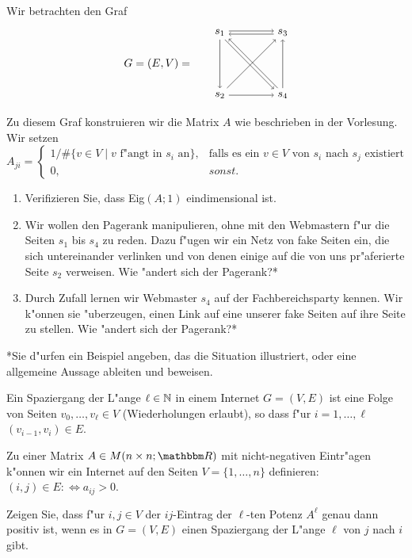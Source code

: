 \documentclass[a4,11pt]{article}
\begin{document}
\begin{aufgabe}[4 Punkte]
Wir betrachten den Graf %
\[
\begin{tikzpicture}
\node at (-2, 1) {$G = (E, V) = $};

\node (s3) at (2,2) {$s_3$};
\node (s4) at (2,0) {$s_4$};
\node (s2) at (0,0) {$s_2$};
\node (s1) at (0,2) {$s_1$};

\draw[->] (s1) -- (s2);
\draw[->] (s1.10) -- (s3.170);
\draw[->] (s1.305) -- (s4.145);

\draw[->] (s2) -- (s3);
\draw[->] (s2) -- (s4);

\draw[->] (s3.190) -- (s1.350);

\draw[->] (s4.125) -- (s1.325);
\draw[->] (s4) -- (s3);
\end{tikzpicture}
\]

Zu diesem Graf konstruieren wir die Matrix $A$ wie beschrieben in der Vorlesung. Wir setzen
\[
A_{ji} = \begin{cases}
1 / \# \{ v \in V \mid v \text{ f"angt in } s_i \text{ an}\}, & \text{falls es ein } v \in V \text{  von } s_i \text{ nach } s_j \text{ existiert}\\
0, & sonst.
\end{cases}
\]

\begin{enumerate}
\item
Verifizieren Sie, dass Eig$(A;1)$ eindimensional ist.
\item
Wir wollen den Pagerank manipulieren, ohne mit den Webmastern f"ur
  die Seiten $s_1$ bis $s_4$ zu reden. Dazu f"ugen wir ein Netz von fake
  Seiten ein, die sich untereinander verlinken und von denen einige
  auf die von uns pr"aferierte Seite $s_2$ verweisen.
  Wie "andert sich der Pagerank?*
 \item
  Durch Zufall lernen wir Webmaster $s_4$ auf der Fachbereichsparty
  kennen. Wir k"onnen sie "uberzeugen, einen Link auf eine unserer
  fake Seiten auf ihre Seite zu stellen. Wie "andert sich der Pagerank?*
\end{enumerate}
 *Sie d"urfen ein Beispiel angeben, das die Situation illustriert, oder eine allgemeine Aussage ableiten und beweisen.
\end{aufgabe}


\begin{aufgabe}[4 Punkte]
Ein Spaziergang der L"ange $\ell \in \mathbb N$ in einem Internet $G=(V,E)$ ist
eine Folge von Seiten $v_0, \ldots, v_\ell \in V$ (Wiederholungen
erlaubt), so dass f"ur $i=1, \ldots, \ell$ $(v_{i-1},v_i) \in E$.

Zu einer Matrix $A \in M(n \times n; \R)$ mit nicht-negativen
Eintr"agen k"onnen wir ein Internet auf den Seiten $V = \{ 1, \ldots,
n \}$ definieren: $(i,j) \in E :\Leftrightarrow a_{ij} > 0$.

Zeigen Sie, dass f"ur $i,j \in V$ der $ij$-Eintrag der $\ell$-ten
Potenz $A^\ell$ genau dann positiv ist, wenn es in $G=(V,E)$ einen
Spaziergang der L"ange $\ell$ von $j$ nach $i$ gibt.
  
\end{aufgabe}
\end{document}
